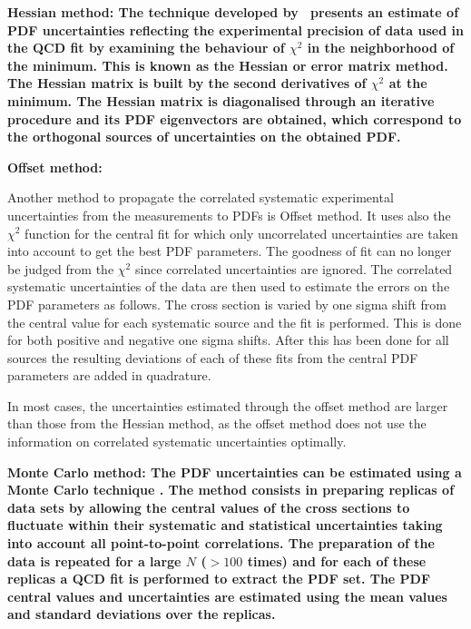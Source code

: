 \begin{description}
\item \bf{Hessian method:} \rm
The technique developed by~\cite{Pumplin:2001ct} presents an estimate of PDF uncertainties 
reflecting the experimental precision of data used in the QCD fit by examining the behaviour 
of $\chi^2$ 
in the neighborhood of the minimum. 
This is known as the Hessian or error matrix method. 
The Hessian matrix is built by the second derivatives of $\chi^2$ at the minimum. 
%
The Hessian matrix is diagonalised through an iterative procedure and its PDF eigenvectors
are obtained, which correspond to the orthogonal sources of uncertainties on the obtained PDF.

\item \bf{Offset  method:} \rm

Another method to propagate the correlated systematic experimental uncertainties from 
the measurements to PDFs \cite{Botje:2001fx} is Offset method.
%
It uses also the $\chi^2$ function for the central fit for which only
uncorrelated uncertainties are taken into account to get the best PDF parameters. The goodness of fit can no longer be judged from the $\chi^2$ since correlated uncertainties are ignored. 
%
The correlated systematic uncertainties of the data are then used to estimate 
the errors on the PDF parameters as follows.
The cross section is varied by one sigma shift from the central value 
for each systematic source and the fit is performed. 
This is done for both positive and negative one sigma shifts. 
After this has been done for all sources the 
resulting deviations of each of these fits from the central PDF parameters are added in quadrature. 

In most cases, the uncertainties estimated through the offset method are larger than 
those from the Hessian method, as the offset method does not use the information on correlated systematic uncertainties optimally.

\item \bf{Monte Carlo method:} \rm
The PDF uncertainties can be estimated using a Monte Carlo technique \cite{Giele:1998gw, mcmethod2}.
The method consists in preparing replicas of data sets by allowing the central values of the cross sections to 
fluctuate within their systematic and statistical uncertainties taking into account all point-to-point correlations.
The preparation of the data is repeated for a large $N$ ($>100$ times) and for each of these replicas a QCD fit is performed to 
extract the PDF set. The PDF central values and uncertainties are estimated using the mean values and standard deviations
over the replicas. 


\end{description}
